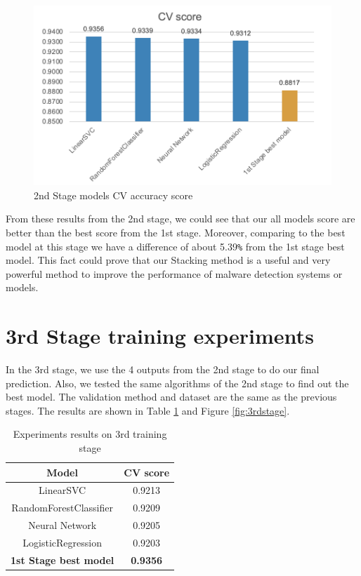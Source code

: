     \begin{figure}[htbp]
        \centering
        \includegraphics[scale=0.7]{./Figure/2ndstage.png}
        \caption{2nd Stage models CV accuracy score}
        \label{fig:2ndstage}
      \end{figure}

From these results from the 2nd stage, we could see that our all models score are better than the best score from the 1st stage. Moreover, comparing to the best model at this stage we have a difference of about 5.39\verb+%+ from the 1st stage best model. This fact could prove that our Stacking method is a useful and very powerful method to improve the performance of malware detection systems or models.

\section{3rd Stage training experiments}

In the 3rd stage, we use the 4 outputs from the 2nd stage to do our final prediction.
Also, we tested the same algorithms of the 2nd stage to find out the best model. The validation method and dataset are the same as the previous stages.
The results are shown in Table \ref{table:3rdstage} and Figure \ref{fig:3rdstage}.

\begin{table}[htbp]
    \centering
    \caption{Experiments results on 3rd training stage}
    \label{table:3rdstage}
        
        \begin{tabular}{|cc|}
            \hline
            
            Model & CV score \\ \hline
            LinearSVC & 0.9213 \\ \hline
            RandomForestClassifier & 0.9209 \\ \hline
            Neural Network & 0.9205 \\ \hline
            LogisticRegression & 0.9203 \\ \hline
            \textbf{1st Stage best model} & \textbf{0.9356} \\ \hline
            
            \end{tabular}
    \end{table}

